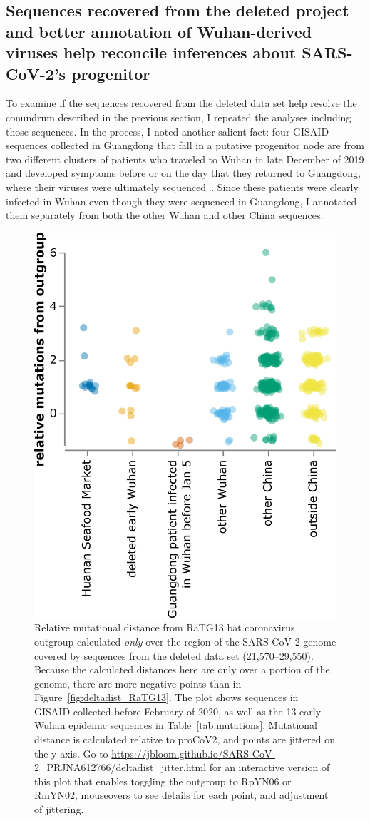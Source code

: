 \documentclass[9pt,twocolumn,twoside]{gsajnl_modified}
\begin{document}
\subsection{Sequences recovered from the deleted project and better annotation of Wuhan-derived viruses help reconcile inferences about SARS-CoV-2's progenitor}
To examine if the sequences recovered from the deleted data set help resolve the conundrum described in the previous section, I repeated the analyses including those sequences.
In the process, I noted another salient fact: four GISAID sequences collected in Guangdong that fall in a putative progenitor node are from two different clusters of patients who traveled to Wuhan in late December of 2019 and developed symptoms before or on the day that they returned to Guangdong, where their viruses were ultimately sequenced~\citep{chan2020familial, kang2020evidence}.
Since these patients were clearly infected in Wuhan even though they were sequenced in Guangdong, I annotated them separately from both the other Wuhan and other China sequences.

\begin{figure}
\centering
\includegraphics[width=0.75\linewidth]{figures/deltadist_jitter.png}
\caption{
Relative mutational distance from RaTG13 bat coronavirus outgroup calculated \emph{only} over the region of the SARS-CoV-2 genome covered by sequences from the deleted data set (21,570--29,550).
Because the calculated distances here are only over a portion of the genome, there are more negative points than in Figure~\ref{fig:deltadist_RaTG13}.
The plot shows sequences in GISAID collected before February of 2020, as well as the 13 early Wuhan epidemic sequences in Table~\ref{tab:mutations}.
Mutational distance is calculated relative to proCoV2, and points are jittered on the y-axis.
Go to \url{https://jbloom.github.io/SARS-CoV-2_PRJNA612766/deltadist_jitter.html} for an interactive version of this plot that enables toggling the outgroup to RpYN06 or RmYN02, mouseovers to see details for each point, and adjustment of jittering.
\label{fig:deltadist_jitter}
}
\end{figure}
\end{document}
